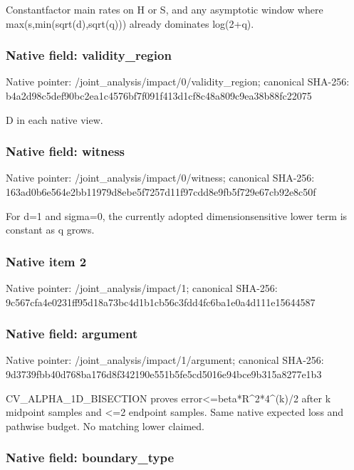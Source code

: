 \documentclass[10pt,a4paper]{article}
\begin{document}
Constantfactor main rates on H or S, and any asymptotic window where max(s,min(sqrt(d),sqrt(q))) already dominates log(2+q).


\subsubsection{Native field: validity\_region}


Native pointer: /joint\_analysis/impact/0\allowbreak{}/validity\_region; canonical SHA-256: b4a2d98c5def90bc2ea1c457\allowbreak{}6bf7f091f413d1cf8c48a809\allowbreak{}c9ea38b88fc22075


D in each native view.


\subsubsection{Native field: witness}


Native pointer: /joint\_analysis/impact/0/witness; canonical SHA-256: 163ad0b6e564e2bb11979d8e\allowbreak{}be5f7257d11f97cdd8e9fb5f\allowbreak{}729e67cb92e8c50f


For d=1 and sigma=0, the currently adopted dimensionsensitive lower term is constant as q grows.


\subsubsection{Native item 2}


Native pointer: /joint\_analysis/impact/1; canonical SHA-256: 9c567cfa4e0231ff95d18a73\allowbreak{}bc4d1b1cb56c3fdd4fc6ba1e\allowbreak{}0a4d111e15644587



\subsubsection{Native field: argument}


Native pointer: /joint\_analysis/impact/1/argument; canonical SHA-256: 9d3739fbb40d768ba176d8f3\allowbreak{}42190e551b5fe5cd5016e94b\allowbreak{}ce9b315a8277e1b3


CV\_ALPHA\_1D\_BISECTION proves error<=beta*R\textasciicircum{}2*4\textasciicircum{}(k)/2 after k midpoint samples and <=2 endpoint samples. Same native expected loss and pathwise budget. No matching lower claimed.


\subsubsection{Native field: boundary\_type}
\end{document}
